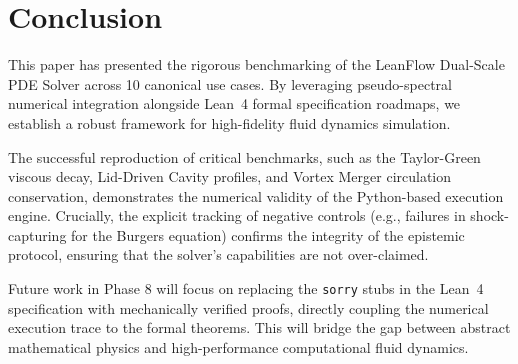 \section{Conclusion}
\label{sec:conclusion}

This paper has presented the rigorous benchmarking of the LeanFlow Dual-Scale PDE Solver across 10 canonical use cases. By leveraging pseudo-spectral numerical integration alongside Lean~4 formal specification roadmaps, we establish a robust framework for high-fidelity fluid dynamics simulation.

The successful reproduction of critical benchmarks, such as the Taylor-Green viscous decay, Lid-Driven Cavity profiles, and Vortex Merger circulation conservation, demonstrates the numerical validity of the Python-based execution engine. Crucially, the explicit tracking of negative controls (e.g., failures in shock-capturing for the Burgers equation) confirms the integrity of the epistemic protocol, ensuring that the solver's capabilities are not over-claimed.

Future work in Phase 8 will focus on replacing the \texttt{sorry} stubs in the Lean~4 specification with mechanically verified proofs, directly coupling the numerical execution trace to the formal theorems. This will bridge the gap between abstract mathematical physics and high-performance computational fluid dynamics.
